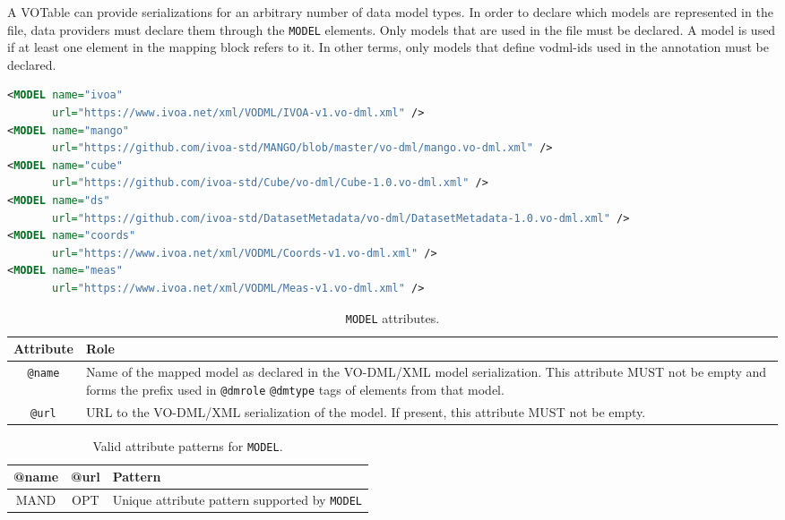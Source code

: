 A VOTable can provide serializations for an arbitrary number of data model
types. In order to declare which models are represented in the file, data
providers must declare them through the \texttt{MODEL} elements.
Only models that are used in the file must be declared. A model is
used if at least one element in the mapping block refers to it. In other terms, only models that define vodml-ids used in the
annotation must be declared.

\begin{lstlisting}[caption={Example \texttt{MODEL} mapping block. (see in context line \ref{MODEL_snippet}) },language=XML]
<MODEL name="ivoa"   
       url="https://www.ivoa.net/xml/VODML/IVOA-v1.vo-dml.xml" />
<MODEL name="mango"
       url="https://github.com/ivoa-std/MANGO/blob/master/vo-dml/mango.vo-dml.xml" />
<MODEL name="cube"
       url="https://github.com/ivoa-std/Cube/vo-dml/Cube-1.0.vo-dml.xml" />
<MODEL name="ds"
       url="https://github.com/ivoa-std/DatasetMetadata/vo-dml/DatasetMetadata-1.0.vo-dml.xml" />
<MODEL name="coords" 
       url="https://www.ivoa.net/xml/VODML/Coords-v1.vo-dml.xml" />
<MODEL name="meas"   
       url="https://www.ivoa.net/xml/VODML/Meas-v1.vo-dml.xml" />
\end{lstlisting}

\begin{table}[!htbp]
  \small
  \centering
  \begin{tabulary}{\linewidth}{|c|J|}       
    \hline 
         \textbf{Attribute} & 
         \textbf {Role}\\
    \hline
    \hline  
         \texttt{@name}  & 
         Name of the mapped model as declared in the VO-DML/XML model serialization.  This attribute MUST not be empty and forms the prefix used in  \texttt{@dmrole}  \texttt{@dmtype} tags of elements from that model.  \\
    \hline 
         \texttt{@url} & 
         URL to the VO-DML/XML serialization of the model. If present, this attribute MUST not be empty.\\
    \hline 
  \end{tabulary}
  \caption{\texttt{MODEL} attributes.} 
  \label{tbl:model-att}
\end{table}


\begin{table}[!htbp]
  \small
  \centering
  \begin{tabulary}{\linewidth}{|c |c |J|}
    \hline 
        \textbf{@name} &
        \textbf{@url} &
        \textbf{Pattern}\\
    \hline      \hline  
        MAND &           
        OPT &           
        Unique attribute pattern supported by \texttt{MODEL}\\
    \hline 
  \end{tabulary}
  \caption{Valid attribute patterns for  \texttt{MODEL}.} 
  \label{tbl:model-pattern}
\end{table}
